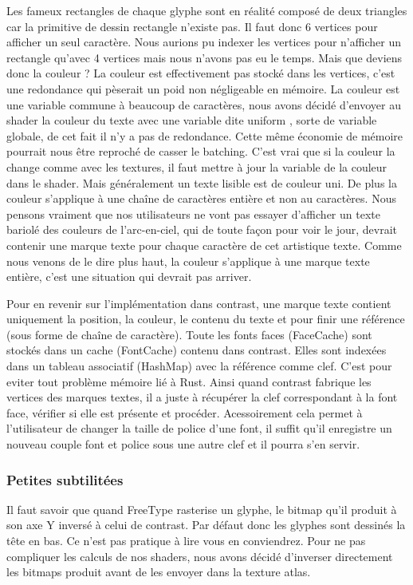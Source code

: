 \documentclass[12pt]{article}
\begin{document}
Les fameux rectangles de chaque glyphe sont en réalité composé de deux triangles car la primitive de dessin rectangle n'existe pas. Il faut donc 6 vertices pour afficher un seul caractère.
Nous aurions pu indexer les vertices pour n'afficher un rectangle qu'avec 4 vertices mais nous n'avons pas eu le temps.
Mais que deviens donc la couleur ? La couleur est effectivement pas stocké dans les vertices, c'est une redondance qui pèserait un poid non négligeable en mémoire. La couleur est une variable
commune à beaucoup de caractères, nous avons décidé d'envoyer au shader la couleur du texte avec une variable dite \og uniform \fg{}, sorte de variable globale, de cet fait il n'y a pas de redondance.
Cette même économie de mémoire pourrait nous être reproché de casser le batching. C'est vrai que si la couleur la change comme avec les textures, il faut mettre à jour la variable de la couleur
dans le shader. Mais généralement un texte lisible est de couleur uni. De plus la couleur s'applique à une chaîne de caractères entière et non au caractères. Nous pensons vraiment que nos utilisateurs
ne vont pas essayer d'afficher un texte bariolé des couleurs de l'arc-en-ciel, qui de toute façon pour voir le jour, devrait contenir une marque texte pour chaque caractère de cet artistique texte.
Comme nous venons de le dire plus haut, la couleur s'applique à une marque texte entière, c'est une situation qui devrait pas arriver.

Pour en revenir sur l'implémentation dans contrast, une marque texte contient uniquement la position, la couleur, le contenu du texte et pour finir une référence (sous forme
de chaîne de caractère). Toute les fonts faces (FaceCache) sont stockés dans un cache (FontCache) contenu dans contrast. Elles sont indexées dans un tableau associatif (HashMap) avec la référence
comme clef. C'est pour eviter tout problème mémoire lié à Rust. Ainsi quand contrast fabrique les vertices des marques textes, il a juste à récupérer la clef correspondant à la font face,
vérifier si elle est présente et procéder. Acessoirement cela permet à l'utilisateur de changer la taille de police d'une font, il suffit qu'il enregistre un nouveau couple font et police
sous une autre clef et il pourra s'en servir.

\subsubsection{Petites subtilitées}

Il faut savoir que quand FreeType rasterise un glyphe, le bitmap qu'il produit à son axe Y inversé à celui de contrast. Par défaut donc les glyphes sont dessinés la tête en bas.
Ce n'est pas pratique à lire vous en conviendrez. Pour ne pas compliquer les calculs de nos shaders, nous avons décidé d'inverser directement les bitmaps produit avant de les envoyer
dans la texture atlas.
\end{document}
